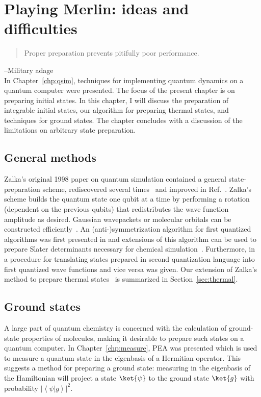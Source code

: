 \documentclass[11pt,oneside,final]{huthesis}%
\begin{document}


\chapter{Playing Merlin: ideas and difficulties}\label{chp:stateprep}
\begin{quotation}
Proper preparation prevents pitifully poor performance.
\end{quotation}
--Military adage\\[3ex]

In Chapter~\ref{chp:qsim}, techniques for implementing quantum dynamics on a quantum computer were presented.  The focus of the present chapter is on preparing initial states. In this chapter, I will discuss the preparation of integrable initial states, our algorithm for preparing thermal states, and techniques for ground states.   The chapter concludes with a discussion of the limitations on arbitrary state preparation.

\section{General methods}

Zalka's original 1998 paper \cite{Zalka98} on quantum simulation contained a general
state-preparation scheme, rediscovered several times~\cite{Grover02,Kaye04,Kitaev08} and improved in Ref.~\cite{Soklakov06}. Zalka's scheme builds the quantum state one qubit
at a time by performing a rotation (dependent on the previous qubits) that
redistributes the wave function amplitude as desired.  Gaussian
wavepackets or molecular orbitals can be constructed efficiently~\cite{Ward09,Kitaev08}.
An (anti-)symmetrization algorithm for first quantized algorithms was first presented in \cite{Abrams97} and extensions of this algorithm can be used to prepare Slater determinants necessary for chemical simulation~\cite{Ward09}. Furthermore, in~\cite{Ward09} a procedure for translating states prepared in second quantization language into first quantized wave functions and vice versa was given. Our extension of Zalka's method to prepare thermal states~\cite{Yung10} is summarized in Section~\ref{sec:thermal}.

\section{Ground states}

A large part of quantum chemistry is concerned with the calculation of
ground-state properties of molecules, making it desirable to prepare such states
on a quantum computer. In Chapter~\ref{chp:measure}, PEA was presented which is
used to measure a quantum state in the eigenbasis of a Hermitian operator. This
suggests a method for preparing a ground state: measuring in the eigenbasis of
the Hamiltonian will project a state $\ket{\psi}$ to the ground state $\ket{g}$
with probability $\left| \left\langle \psi | g \right\rangle \right|^2$.
\end{document}
